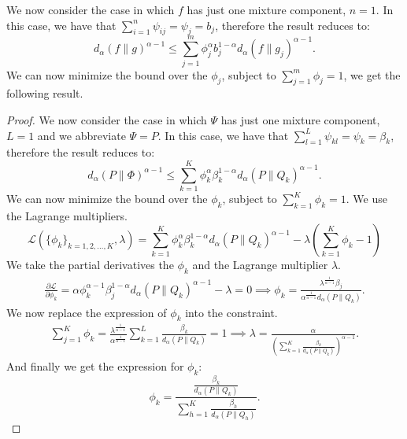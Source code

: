 \documentclass{article}
\begin{document}
We now consider the case in which $f$ has just one mixture component, \ie $n = 1$. In this case, we have that $\sum_{i=1}^n \psi_{ij}= \psi_j = b_j$, therefore the result reduces to:
\begin{equation}
     d_{\alpha} (f \| g)^{\alpha-1} \le  \sum_{j=1}^m \phi_{j}^\alpha b_{j}^{1-\alpha} d_{\alpha} (f \| g_j)^{\alpha-1}.
\end{equation}
We can now minimize the bound over the $\phi_j$, subject to $\sum_{j=1}^m \phi_j = 1$, we get the following result.

\armonic*
\begin{proof}
We now consider the case in which $\Psi$ has just one mixture component, \ie $L = 1$ and we abbreviate $\Psi = P$. In this case, we have that $\sum_{l=1}^L \psi_{kl}= \psi_k = \beta_k$, therefore the result reduces to:
\begin{equation}
     d_{\alpha} (P \| \Phi)^{\alpha-1} \le  \sum_{k=1}^K \phi_{k}^\alpha \beta_{k}^{1-\alpha} d_{\alpha} (P \| Q_k)^{\alpha-1}.
\end{equation}
We can now minimize the bound over the $\phi_k$, subject to $\sum_{k=1}^K \phi_k = 1$. We use the Lagrange multipliers.
    \begin{equation*}
        \mathcal{L}(\{\phi_k\}_{k=1,2,...,K}, \lambda) = \sum_{k=1}^K \phi_{k}^\alpha \beta_{k}^{1-\alpha} d_{\alpha} (P \| Q_k)^{\alpha-1} - \lambda \left( \sum_{k=1}^K \phi_k -1 \right)
    \end{equation*}
    We take the partial derivatives \wrt the $\phi_k$ and the Lagrange multiplier $\lambda$.
    \begin{align*}
        \frac{\partial \mathcal{L}}{\partial \phi_k} = \alpha \phi_k^{\alpha-1} \beta_j^{1-\alpha} d_{\alpha}(P \| Q_k)^{\alpha-1} - \lambda = 0 \implies \phi_k = \frac{\lambda^{\frac{1}{\alpha-1}}  \beta_j}{\alpha^{\frac{1}{\alpha-1}} d_{\alpha}(P \| Q_k)}.
    \end{align*}
    We now replace the expression of $\phi_k$ into the constraint.
    \begin{align*}
        \sum_{j=1}^K \phi_k = \frac{\lambda^\frac{1}{\alpha-1}}{\alpha^\frac{1}{\alpha-1}}  \sum_{k=1}^L \frac{ \beta_k}{ d_{\alpha}(P \| Q_k)} = 1 \implies \lambda = \frac{\alpha}{\left( \sum_{k=1}^K \frac{ \beta_k}{ d_{\alpha}(P \| Q_k)}\right)^{{\alpha-1}}}.
    \end{align*}
    And finally we get the expression for $\phi_k$:
    \begin{equation}
        \phi_k = \frac{\frac{\beta_k}{d_{\alpha}(P \| Q_k)}} {\sum_{h=1}^K \frac{ \beta_h}{ d_{\alpha}(P \| Q_h)}}.

\end{equation}
\end{proof}
\end{document}
